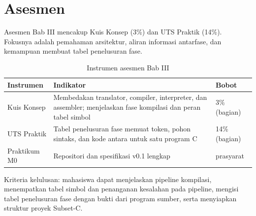 \section*{Asesmen}

Asesmen Bab III mencakup Kuis Konsep (3\%) dan UTS Praktik (14\%).
Fokusnya adalah pemahaman arsitektur, aliran informasi antarfase, dan
kemampuan membuat tabel penelusuran fase.

\begin{table}[H]
\centering
\caption{Instrumen asesmen Bab III}
\label{tab:ch03-asesmen}
\begin{tabularx}{\textwidth}{@{}lXl@{}}
\toprule
\textbf{Instrumen} & \textbf{Indikator} & \textbf{Bobot} \\
\midrule
Kuis Konsep & Membedakan translator, compiler, interpreter, dan
assembler; menjelaskan fase kompilasi dan peran tabel simbol &
3\% (bagian) \\
UTS Praktik & Tabel penelusuran fase memuat token, pohon sintaks, dan
kode antara untuk satu program C & 14\% (bagian) \\
Praktikum M0 & Repositori dan spesifikasi v0.1 lengkap & prasyarat \\
\bottomrule
\end{tabularx}
\end{table}

Kriteria kelulusan: mahasiswa dapat menjelaskan pipeline kompilasi,
menempatkan tabel simbol dan penanganan kesalahan pada pipeline,
mengisi tabel penelusuran fase dengan bukti dari program sumber, serta
menyiapkan struktur proyek Subset-C.
